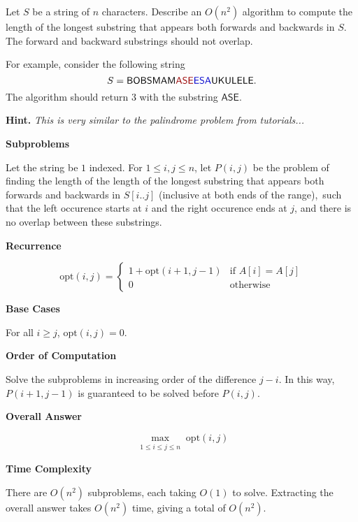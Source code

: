 \documentclass{article}
\begin{document}
\begin{question}
Let $S$ be a string of $n$ characters. Describe an $O(n^2)$ algorithm to compute the length of the longest substring that appears both forwards and backwards in $S$. The forward and backward substrings should not overlap.

For example, consider the following string \[S = \mathsf{BOBSMAM\textcolor{red!60!black}{ASE}\textcolor{blue!80!black}{ESA}UKULELE}.\] The algorithm should return 3 with the substring $\mathsf{ASE}$.

{\bfseries Hint.} {\em This is very similar to the palindrome problem from tutorials...}
\end{question}

\begin{solution}

\textbf{Subproblems}

Let the string be $1$ indexed.
For $1\leq i, j \leq n$, 
let $P(i, j)$ be the problem of finding the length of the length of the longest 
substring that appears both forwards and backwards in $S[i..j]$ (inclusive at both ends of the range),\
such that the left occurence starts at $i$ and the right occurence ends at $j$,
and there is no overlap between these substrings.

\textbf{Recurrence}

$$\mathrm{opt}(i,j) = \begin{cases}
    1+\mathrm{opt}(i+1, j-1) & \text{if }A[i]=A[j]\\
    0 &\text{otherwise}
\end{cases}    $$

\textbf{Base Cases}

For all $i \geq j$, $\mathrm{opt}(i, j) = 0$.

\textbf{Order of Computation}

Solve the subproblems in increasing order of the difference $j-i$.
In this way, $P(i+1, j-1)$ is guaranteed to be solved before $P(i, j)$.

\textbf{Overall Answer}

$$\max_{\substack{1\leq i\leq j \leq n}} \mathrm{opt}(i, j)$$

\textbf{Time Complexity}

There are $O(n^2)$ subproblems, each taking $O(1)$ to solve.
Extracting the overall answer takes $O(n^2)$ time, giving a total of $O(n^2)$.

\end{solution}
\end{document}
